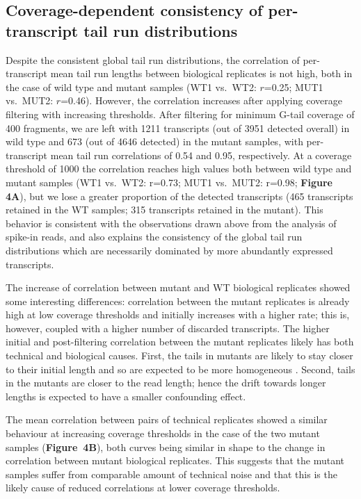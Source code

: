 \documentclass[10pt]{article}
\begin{document}
\subsection*{Coverage-dependent consistency of per-transcript tail run distributions}

Despite the consistent global tail run distributions, the correlation of per-transcript mean tail run lengths between biological replicates is not high, both in the case of wild type and mutant samples (WT1 vs.\ WT2: $r$=0.25; MUT1 vs.\ MUT2: $r$=0.46).
However, the correlation increases after applying coverage filtering with increasing thresholds. After filtering for minimum G-tail coverage of 400 fragments, we are left with 1211 transcripts (out of 3951 detected overall) in wild type and 673 (out of 4646 detected) in the mutant samples, with per-transcript mean tail run correlations of 0.54 and 0.95, respectively.
At a coverage threshold of 1000 the correlation reaches high values both between wild type and mutant samples (WT1 vs.\ WT2: r=0.73; MUT1 vs.\ MUT2: r=0.98; \textbf{Figure 4A}), but we lose a greater proportion of the detected transcripts (465 transcripts retained in the WT samples; 315 transcripts retained in the mutant). 
This behavior is consistent with the observations drawn above from the analysis of spike-in reads, and also explains the consistency of the global tail run distributions which are necessarily dominated by more abundantly expressed transcripts.


The increase of correlation between mutant and WT biological replicates showed some interesting differences: correlation between the mutant replicates is already high at low coverage thresholds and initially increases with a higher rate; this is, however, coupled with a higher number of discarded transcripts. The higher initial and post-filtering correlation between the mutant replicates likely has both technical and biological causes. First, the tails in mutants are likely to stay closer to their initial length and so are expected to be more homogeneous \cite{traven05,beilharz07}. Second, tails in the mutants are closer to the read length; hence the drift towards longer lengths is expected to have a smaller confounding effect.

The mean correlation between pairs of technical replicates showed a similar behaviour at increasing coverage thresholds in the case of the two mutant samples (\textbf{Figure~4B}), both curves being similar in shape to the change in correlation between mutant biological replicates. This suggests that the mutant samples suffer from comparable amount of technical noise and that this is the likely cause of reduced correlations at lower coverage thresholds.
\end{document}
